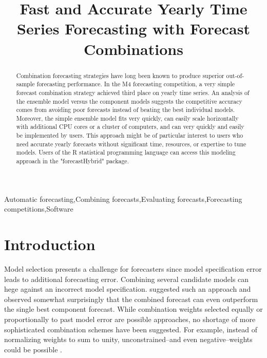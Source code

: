 \documentclass[11pt,3p,review,authoryear]{elsarticle}
\begin{document}
\begin{frontmatter}

\title{Fast and Accurate Yearly Time Series Forecasting with Forecast Combinations}





\begin{abstract}
Combination forecasting strategies have long been known to produce superior out-of-sample forecasting performance. In the M4 forecasting competition, a very simple forecast combination strategy achieved third place on yearly time series. An analysis of the ensemble model versus the component models suggests the competitive accuracy comes from avoiding poor forecasts instead of beating the best individual models. Moreover, the simple ensemble model fits very quickly, can easily scale horizontally with additional CPU cores or a cluster of computers, and can very quickly and easily be implemented by users. This approach might be of particular interest to users who need accurate yearly forecasts without significant time, resources, or expertise to tune models. Users of the R statistical programming language can access this modeling approach in the "forecastHybrid" package.
\end{abstract}

\begin{keyword}
Automatic forecasting\sep Combining forecasts\sep Evaluating forecasts\sep Forecasting competitions\sep Software
\end{keyword}

\end{frontmatter}


\section{Introduction}
Model selection presents a challenge for forecasters since model specification error leads to additional forecasting error. Combining several candidate models can hege against an incorrect model specification. \cite{BatesGranger1969} suggested such an approach and observed somewhat surprisingly that the combined forecast can even outperform the single best component forecast. While combination weights selected equally or proportionally to past model error are possible approaches, no shortage of more sophisticated combination schemes have been suggested. For example, instead of normalizing weights to sum to unity, unconstrained--and even negative--weights could be possible \citep{GrangerRamanathan1984}.
\end{document}
